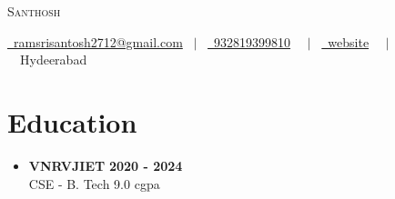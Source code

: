 \documentclass[letterpaper,5pt]{article}
\begin{document}
    

    
    \begin{center}
        {\Huge \scshape Santhosh} \\ \vspace{1pt}
        
        \href{mailto:ramsrisantosh2712@gmail.com}{\raisebox{-0.05\height}\faEnvelope \ ramsrisantosh2712@gmail.com} 
        \ $|$ \ \href{tel:932819399810}{\raisebox{-0.05\height}\faMobile \ 932819399810}  \
        \ $|$ \ \href{website}{\raisebox{-0.05\height}\faGlobe \ website}  \
        \ $|$ \ {\raisebox{-0.05\height}\faMapMarker \ Hydeerabad} \ \  
        \vspace{-8pt}
    \end{center}
    
    
      \section{\textbf{Education}}
      
          \begin{itemize}[leftmargin=0in, label={}]
          \item
            \textbf{VNRVJIET} \hfill \textbf{2020 - 2024} \\
            CSE - B. Tech \hfill 9.0 cgpa
          \end{itemize}
          \vspace*{-3mm}
        
        \vspace{3mm}
    
    

    
    \vspace*{-4mm}
\end{document}
